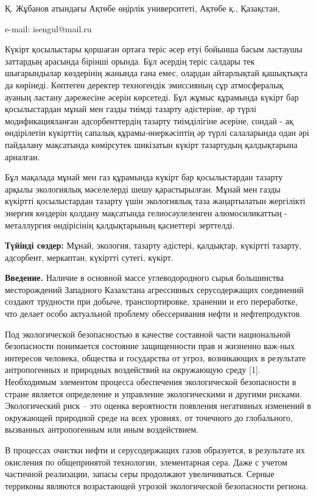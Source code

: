 Қ. Жұбанов атындағы Ақтөбе өңірлік университеті, Ақтөбе қ., Қазақстан,

e-mail: isengul@mail.ru

Күкірт қосылыстары қоршаған ортаға теріс әсер етуі бойынша басым
ластаушы заттардың арасында бірінші орында. Бұл әсердің теріс салдары
тек шығарындылар көздерінің жанында ғана емес, олардан айтарлықтай
қашықтықта да көрінеді. Көптеген деректер техногендік эмиссияның сұр
атмосфералық ауаның ластану дәрежесіне әсерін көрсетеді. Бұл жұмыс
құрамында күкірт бар қосылыстардан мұнай мен газды тиімді тазарту
әдістеріне, әр түрлі модификацияланған адсорбенттердің тазарту
тиімділігіне әсеріне, сондай - ақ өндірілетін күкірттің сапалық
құрамы-өнеркәсіптің әр түрлі салаларында одан әрі пайдалану мақсатында
көмірсутек шикізатын күкірт тазартудың қалдықтарына арналған.

Бұл мақалада мұнай мен газ құрамында күкірт бар қосылыстардан тазарту
арқылы экологиялық мәселелерді шешу қарастырылған. Мұнай мен газды
күкіртті қосылыстардан тазарту үшін экологиялық таза жаңартылатын
жергілікті энергия көздерін қолдану мақсатында гелиосәулеленген
алюмосиликаттың - металлургия өндірісінің қалдықтарының қасиеттері
зерттелді.

{\bfseries Түйінді сөздер:} Мұнай, экология, тазарту әдістері, қалдықтар,
күкіртті тазарту, адсорбент, меркаптан, күкіртті сутегі, күкірт.

{\bfseries Введение.} Наличие в основной массе углеводородного сырья
большинства месторождений Западного Казахстана агрессивных
серусодержащих соединений создают трудности при добыче, транспортировке,
хранении и его переработке, что делает особо актуальной проблему
обессеривания нефти и нефтепродуктов.

Под экологической безопасностью в качестве составной части национальной
безопасности понимается состояние защищенности прав и жизненно важ-ных
интересов человека, общества и государства от угроз, возникающих в
результате антропогенных и природных воздействий на окружающую среду
{[}1{]}. Необходимым элементом процесса обеспечения экологической
безопасности в стране является определение и управление экологическими и
другими рисками. Экологический риск -- это оценка вероятности появления
негативных изменений в окружающей природной среде на всех уровнях, от
точечного до глобального, вызванных антропогенным или иным воздействием.

В процессах очистки нефти и серусодержащих газов образуется, в
результате их окисления по общепринятой технологии, элементарная сера.
Даже с учетом частичной реализации, запасы серы продолжают
увеличиваться. Серные терриконы являются возрастающей угрозой
экологической безопасности региона.

